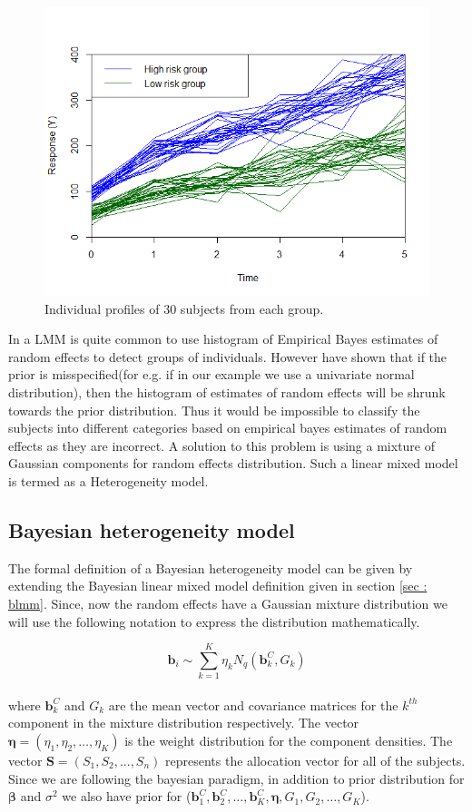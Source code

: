 \begin{figure}
	\centering
	\includegraphics[scale=0.5]{mainmatter/chapter_3_blmm/random_slope_dummy_data.png}
	\caption{Individual profiles of 30 subjects from each group.}
	\label{fig : random_slope_dummy_data}
\end{figure}

In a LMM is quite common to use histogram of Empirical Bayes estimates of random effects to detect groups of individuals. However \citet{verbeke_linear_1996} have shown that if the prior is misspecified(for e.g. if in our example we use a univariate normal distribution), then the histogram of estimates of random effects will be shrunk towards the prior distribution. Thus it would be impossible to classify the subjects into different categories based on empirical bayes estimates of random effects as they are incorrect. A solution to this problem is using a mixture of Gaussian components for random effects distribution. Such a linear mixed model is termed as a Heterogeneity model.

\subsection{Bayesian heterogeneity model}
\label{subsec : bhtge}
The formal definition of a Bayesian heterogeneity model can be given by extending the Bayesian linear mixed model definition given in section \ref{sec : blmm}. Since, now the random effects have a Gaussian mixture distribution we will use the following notation to express the distribution mathematically.

$$\boldsymbol{b}_i \sim \sum_{k=1}^{K} \eta_k N_q(\boldsymbol{b}_k^C, G_k)$$\\
where $\boldsymbol{b}_k^C$ and $G_k$ are the mean vector and covariance matrices for the $k^{th}$ component in the mixture distribution respectively. The vector $\boldsymbol{\eta} = (\eta_1, \eta_2, \ldots, \eta_K)$ is the weight distribution for the component densities. The vector $\boldsymbol{S}=(S_1, S_2, ..., S_n)$ represents the allocation vector for all of the subjects. Since we are following the bayesian paradigm, in addition to prior distribution for $\boldsymbol{\beta}$ and $\sigma^2$ we also have prior for ($\boldsymbol{b}_1^C, \boldsymbol{b}_2^C, \ldots, \boldsymbol{b}_K^C, \boldsymbol{\eta}, G_1, G_2, \ldots, G_K$).

